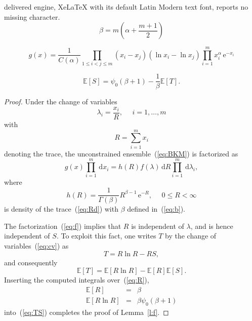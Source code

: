 \documentclass[10pt,a4paper]{amsart}
\newcommand{\dd}{\,\mathrm{d}}
\newcommand{\ee}{\,\mathrm{e}}
\begin{document}
delivered engine, XeLaTeX with its default Latin Modern text font, reports no missing character.
\begin{equation}\label{eq:b}
\beta=m\left(\alpha+\frac{m+1}{2}\right)
\end{equation}

\begin{equation}\label{eq:BKM}
g(x)=\frac{1}{C(\alpha)}\prod_{1\leq i<j\leq m}\left(x_{i}-x_{j}\right)\left(\ln x_{i}-\ln x_{j}\right)\prod_{i=1}^{m}x_{i}^{\alpha}\ee^{-x_{i}}
\end{equation}

\begin{lemma}\label{l:f}
\begin{equation}\label{eq:ST}
\mathbb{E}\left[S\right]=\psi_{0}(\beta+1)-\frac{1}{\beta}\mathbb{E}\left[T\right].
\end{equation}
\end{lemma}

\begin{proof}
Under the change of variables
\begin{equation}\label{eq:cv}
\lambda_i=\frac{x_i}{R},~~~~~~i=1,\dots,m
\end{equation}
with
\begin{equation}\label{eq:Rd}
R=\sum_{i=1}^{m}x_i
\end{equation}
denoting the trace, the unconstrained ensemble~(\ref{eq:BKM}) is factorized as
\begin{equation}\label{eq:f}
g(x)\prod_{i=1}^{m}\dd x_i=h(R)f(\lambda)\dd R\prod_{i=1}^m\dd\lambda_i,
\end{equation}
where
\begin{equation}\label{eq:R}
h(R)=\frac{1}{\Gamma(\beta)}R^{\beta-1}\ee^{-R},~~~~~~0\leq R<\infty
\end{equation}
is density of the trace~(\ref{eq:Rd}) with $\beta$ defined in~(\ref{eq:b}).

The factorization~(\ref{eq:f}) implies that $R$ is independent of $\lambda$, and is hence independent of $S$. To exploit this fact, one writes $T$ by the change of variables~(\ref{eq:cv}) as
\begin{equation}
T=R\ln R-RS,
\end{equation}
and consequently
\begin{equation}\label{eq:TS}
\mathbb{E}[T]=\mathbb{E}[R\ln R]-\mathbb{E}[R]\mathbb{E}[S].
\end{equation}
Inserting the computed integrals over~(\ref{eq:R}),
\begin{eqnarray}
\mathbb{E}[R] &=& \beta \\
\mathbb{E}[R\ln R] &=& \beta\psi_{0}(\beta+1) \label{eq:RT}
\end{eqnarray}
into~(\ref{eq:TS}) completes the proof of Lemma~\ref{l:f}.
\end{proof}
\end{document}
